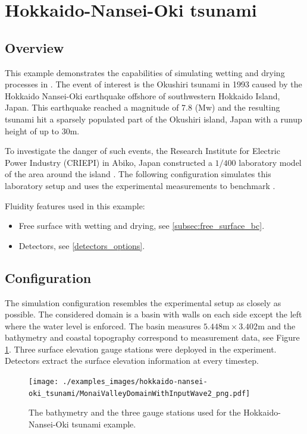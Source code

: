 
\section{Hokkaido-Nansei-Oki tsunami}
\label{sec:hokkaido-nansei-oki_tsunami}

\subsection{Overview}
This example demonstrates the capabilities of simulating wetting and drying processes in \fluidity.
The event of interest is the Okushiri tsunami in 1993 caused by the Hokkaido Nansei-Oki earthquake offshore of southwestern Hokkaido Island, Japan. 
This earthquake reached a magnitude of 7.8 (Mw) and the resulting tsunami hit a sparsely populated part of the Okushiri island, Japan with a runup height of up to 30m.

To investigate the danger of such events, the Research Institute for Electric Power Industry (CRIEPI) in Abiko, Japan constructed a $1/400$ laboratory model of the area around the island \cite{liu2008advanced}. 
The following configuration simulates this laboratory setup and uses the experimental measurements to benchmark \fluidity.

Fluidity features used in this example:
\begin{itemize}
\item Free surface with wetting and drying, see \ref{subsec:free_surface_bc}.
\item Detectors, see \ref{detectors_options}.
\end{itemize}

\subsection{Configuration}
The simulation configuration resembles the experimental setup as closely as possible. 
The considered domain is a basin with walls on each side except the left where the water level is enforced. 
The basin measures $5.448\mbox{m} \times 3.402\mbox{m}$ and the bathymetry and coastal topography correspond to measurement data, see Figure \ref{fig:monai_inputwave}.
Three surface elevation gauge stations were deployed in the experiment.
Detectors  extract the surface elevation information at every timestep. 
\begin{figure}
\begin{center}
\texttt{[image: ./examples\_images/hokkaido-nansei-oki\_tsunami/MonaiValleyDomainWithInputWave2\_png.pdf]}
\end{center}
\caption{The bathymetry and the three gauge stations used for the Hokkaido-Nansei-Oki tsunami example.}\label{fig:monai_inputwave}
\end{figure}

